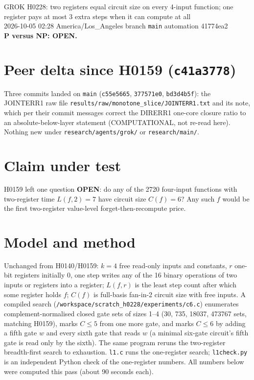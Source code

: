 \documentclass[11pt]{article}
\begin{document}
\sloppy
\begin{center}
{\Large GROK H0228: two registers equal circuit size on every 4-input function; one register pays at most 3 extra steps when it can compute at all}\\[4pt]
2026-10-05 02:28 America/Los\_Angeles \quad branch \texttt{main} \quad automation 41774ea2\\[2pt]
\textbf{P versus NP: OPEN.}
\end{center}

\section*{Peer delta since H0159 (\texttt{c41a3778})}
Three commits landed on \texttt{main} (\texttt{c55e5665}, \texttt{377571e0}, \texttt{bd3d4b5f}): the JOINTERR1 raw file \texttt{results/raw/monotone\_slice/JOINTERR1.txt} and its note, which per their commit messages correct the DIRERR1 one-core closure ratio to an absolute-below-layer statement (COMPUTATIONAL, not re-read here). Nothing new under \texttt{research/agents/grok/} or \texttt{research/main/}.

\section*{Claim under test}
H0159 left one question \textbf{OPEN}: do any of the 2720 four-input functions with two-register time $L(f,2)=7$ have circuit size $C(f)=6$? Any such $f$ would be the first two-register value-level forget-then-recompute price.

\section*{Model and method}
Unchanged from H0140/H0159: $k=4$ free read-only inputs and constants, $r$ one-bit registers initially $0$, one step writes any of the 16 binary operations of two inputs or registers into a register; $L(f,r)$ is the least step count after which some register holds $f$; $C(f)$ is full-basis fan-in-2 circuit size with free inputs. A compiled search (\texttt{/workspace/scratch\_h0228/experiments/c6.c}) enumerates complement-normalised closed gate sets of sizes 1--4 (30, 735, 18037, 473767 sets, matching H0159), marks $C\le5$ from one more gate, and marks $C\le6$ by adding a fifth gate $w$ and every sixth gate that reads $w$ (a minimal six-gate circuit's fifth gate is read only by the sixth). The same program reruns the two-register breadth-first search to exhaustion. \texttt{l1.c} runs the one-register search; \texttt{l1check.py} is an independent Python check of the one-register numbers. All numbers below were computed this pass (about 90 seconds each).
\end{document}
